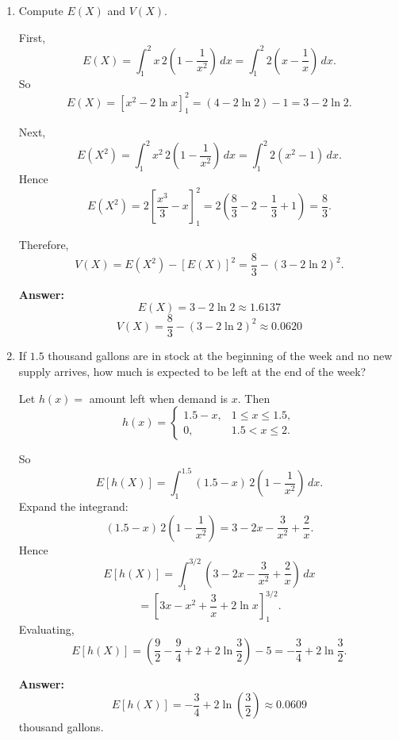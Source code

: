 \documentclass[11pt]{article}
\begin{document}
\begin{enumerate}
    \textbf{Answer:}
    \[
    \boxed{x_p=\frac{p+4+\sqrt{p^2+8p}}{4}}
    \]
    and
    \[
    \boxed{\tilde{\mu}=\frac{9+\sqrt{17}}{8}\approx 1.6404.}
    \]

    \item[(c)] Compute \(E(X)\) and \(V(X)\).

    First,
    \[
    E(X)=\int_1^2 x\,2\left(1-\frac{1}{x^2}\right)\,dx
    =\int_1^2 2\left(x-\frac{1}{x}\right)\,dx.
    \]
    So
    \[
    E(X)=\left[x^2-2\ln x\right]_1^2
    =(4-2\ln 2)-1
    =3-2\ln 2.
    \]

    Next,
    \[
    E(X^2)=\int_1^2 x^2\,2\left(1-\frac{1}{x^2}\right)\,dx
    =\int_1^2 2(x^2-1)\,dx.
    \]
    Hence
    \[
    E(X^2)=2\left[\frac{x^3}{3}-x\right]_1^2
    =2\left(\frac{8}{3}-2-\frac{1}{3}+1\right)
    =\frac{8}{3}.
    \]

    Therefore,
    \[
    V(X)=E(X^2)-[E(X)]^2
    =\frac{8}{3}-(3-2\ln 2)^2.
    \]

    \textbf{Answer:}
    \[
    \boxed{E(X)=3-2\ln 2\approx 1.6137}
    \]
    \[
    \boxed{V(X)=\frac{8}{3}-(3-2\ln 2)^2\approx 0.0620}
    \]

    \item[(d)] If \(1.5\) thousand gallons are in stock at the beginning of the week and no new supply arrives, how much is expected to be left at the end of the week?

    Let \(h(x)=\) amount left when demand is \(x\). Then
    \[
    h(x)=
    \begin{cases}
    1.5-x, & 1\le x\le 1.5,\\
    0, & 1.5<x\le 2.
    \end{cases}
    \]

    So
    \[
    E[h(X)]
    =\int_1^{1.5} (1.5-x)\,2\left(1-\frac{1}{x^2}\right)\,dx.
    \]
    Expand the integrand:
    \[
    (1.5-x)\,2\left(1-\frac{1}{x^2}\right)
    =3-2x-\frac{3}{x^2}+\frac{2}{x}.
    \]
    Hence
    \[
    E[h(X)]
    =\int_1^{3/2}\left(3-2x-\frac{3}{x^2}+\frac{2}{x}\right)\,dx
    \]
    \[
    =\left[3x-x^2+\frac{3}{x}+2\ln x\right]_1^{3/2}.
    \]
    Evaluating,
    \[
    E[h(X)]
    =\left(\frac{9}{2}-\frac{9}{4}+2+2\ln\frac{3}{2}\right)-5
    =-\frac{3}{4}+2\ln\frac{3}{2}.
    \]

    \textbf{Answer:}
    \[
    \boxed{E[h(X)]=-\frac{3}{4}+2\ln\!\left(\frac{3}{2}\right)\approx 0.0609}
    \]
    thousand gallons.
\end{enumerate}
\end{document}
